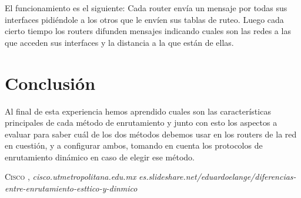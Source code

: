 \documentclass{udpreport}
\begin{document}
\begin{enumerate}
            	El funcionamiento es el siguiente: Cada router envía un mensaje por todas sus interfaces pidiéndole a los otros que le envíen sus tablas de ruteo. Luego cada cierto tiempo los routers difunden mensajes indicando cuales son las redes a las que acceden sus interfaces y la distancia a la que están de ellas.
 
  	     
	\end{enumerate}
	
    
	
\chapter{Conclusión}
 Al final de esta experiencia hemos aprendido cuales son las características principales de cada método de enrutamiento y junto con
 esto los aspectos a evaluar para saber cuál de los dos métodos debemos usar en los routers de la red en cuestión, y a configurar
 ambos, tomando en cuenta los protocolos de enrutamiento dinámico en caso de elegir ese método.\\
\begin{thebibliography}{x}
 \textsc{Cisco },
\textit{cisco.utmetropolitana.edu.mx}
\textit{es.slideshare.net/eduardoelange/diferencias-entre-enrutamiento-esttico-y-dinmico}

\end{thebibliography}
\end{document}

